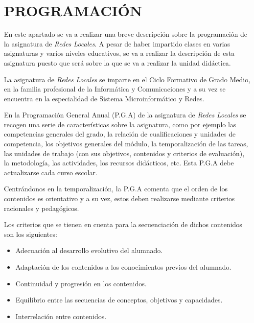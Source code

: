\documentclass[spanish,12pt, a4paper,twoside]{paper}
\let\oldsection\section
\def\section{\cleardoublepage\oldsection}
\begin{document}
\section{PROGRAMACIÓN} %

En este apartado se va a realizar una breve descripción sobre la programación de la asignatura de \textit{Redes Locales}. A pesar de haber impartido clases en varias asignaturas y varios niveles educativos, se va a realizar la descripción de esta asignatura puesto que será sobre la que se va a realizar la unidad didáctica. 

La asignatura de \textit{Redes Locales} se imparte en el Ciclo Formativo de Grado Medio, en la familia profesional de la Informática y Comunicaciones y a su vez se encuentra en la especialidad de Sistema Microinformático y Redes.

En la Programación General Anual (P.G.A) de la asignatura de \textit{Redes Locales} se recogen una serie de características sobre la asignatura, como por ejemplo las competencias generales del grado, la relación de cualificaciones y unidades de competencia, los objetivos generales del módulo, la temporalización de las tareas, las unidades de trabajo (con sus objetivos, contenidos y criterios de evaluación), la metodología, las actividades, los recursos didácticos, etc. Esta P.G.A debe actualizarse cada curso escolar.

Centrándonos en la temporalización, la P.G.A comenta que el orden de los contenidos es orientativo y a su vez, estos deben realizarse mediante criterios racionales y pedagógicos.

Los criterios que se tienen en cuenta para la secuenciación de dichos contenidos son los siguientes:
\begin{itemize}
\item Adecuación al desarrollo evolutivo del alumnado.
\item Adaptación de los contenidos a los conocimientos previos del alumnado.
\item Continuidad y progresión en los contenidos.
\item Equilibrio entre las secuencias de conceptos, objetivos y capacidades.
\item Interrelación entre contenidos.
\end{itemize}
\end{document}
